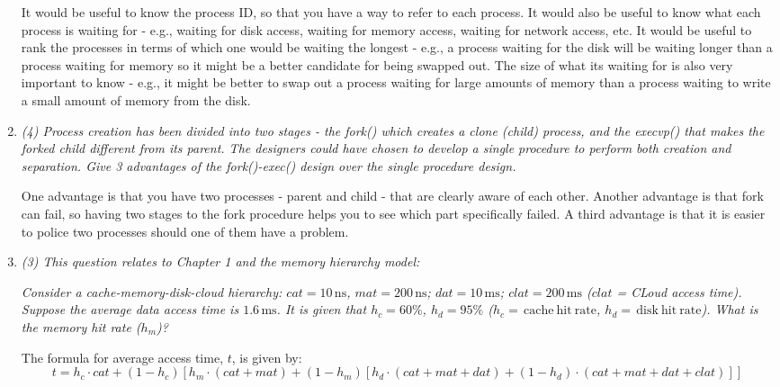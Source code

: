 \documentclass[letterpaper,11pt]{article}
\newcommand{\unit}[1]{\ensuremath{\, \mathrm{#1}}}
\begin{document}
\begin{enumerate}
It would be useful to know the process ID, so that you have a way to refer to each process.  It would also be useful to know what each process is waiting for - e.g., waiting for disk access, waiting for memory access, waiting for network access, etc.  It would be useful to rank the processes in terms of which one would be waiting the longest - e.g., a process waiting for the disk will be waiting longer than a process waiting for memory so it might be a better candidate for being swapped out.  The size of what its waiting for is also very important to know - e.g., it might be better to swap out a process waiting for large amounts of memory than a process waiting to write a small amount of memory from the disk.
\item \emph{(4) Process creation has been divided into two stages - the \emph{fork()} which creates a clone (child) process, and the \emph{execvp()} that makes the forked child different from its parent. The designers could have chosen to develop a single procedure to perform both creation and separation. Give 3 advantages of the \emph{fork()}-\emph{exec()} design over the single procedure design.}

One advantage is that you have two processes - parent and child - that are clearly aware of each other.  Another advantage is that fork can fail, so having two stages to the fork procedure helps you to see which part specifically failed.  A third advantage is that it is easier to police two processes should one of them have a problem.
\item \emph{(3) This question relates to Chapter 1 and the memory hierarchy model:}

\emph{Consider a cache-memory-disk-cloud hierarchy: $cat = 10\unit{ ns}$, $mat = 200\unit{ ns}$; $dat = 10\unit{ ms}$; $clat = 200\unit{ ms}$ ($clat$ = CLoud access time). Suppose the average data access time is $1.6\unit{ ms}$. It is given that $h_c = 60\%$, $h_d = 95\%$ ($h_c = \unit{cache\ hit\ rate}$, $h_d = \unit{disk\ hit\ rate}$). What is the memory hit rate ($h_m$)?}

The formula for average access time, $t$, is given by:
$$
t = h_c\cdot cat + (1 - h_c)[h_m\cdot(cat + mat) + (1 - h_m)[h_d\cdot(cat + mat + dat) + (1 - h_d)\cdot(cat + mat + dat + clat)]]
$$


\end{enumerate}
\end{document}
